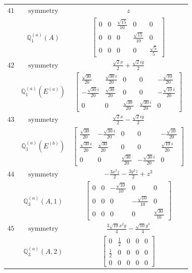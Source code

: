 \documentclass[fleqn,8pt,landscape]{jsarticle}
\begin{document}
\begin{longtable}{ccc}
$ 41 $ & $ \text{symmetry} $ & $ z $ \\
$  $ & $ \mathbb{Q}_{1}^{(a)}(A) $ & $ \begin{bmatrix} 0 & 0 & \frac{\sqrt{15}}{10} & 0 & 0 \\ 0 & 0 & 0 & \frac{\sqrt{15}}{10} & 0 \\ 0 & 0 & 0 & 0 & \frac{\sqrt{5}}{5} \end{bmatrix} $ \\ \hline
$ 42 $ & $ \text{symmetry} $ & $ \frac{\sqrt{2} x}{2} + \frac{\sqrt{2} i y}{2} $ \\
$  $ & $ \mathbb{Q}_{1}^{(a)}(E^{(a)}) $ & $ \begin{bmatrix} \frac{\sqrt{30}}{20} & \frac{\sqrt{30} i}{20} & 0 & 0 & - \frac{\sqrt{10}}{20} \\ - \frac{\sqrt{30} i}{20} & \frac{\sqrt{30}}{20} & 0 & 0 & - \frac{\sqrt{10} i}{20} \\ 0 & 0 & \frac{\sqrt{30}}{20} & \frac{\sqrt{30} i}{20} & 0 \end{bmatrix} $ \\ \hline
$ 43 $ & $ \text{symmetry} $ & $ \frac{\sqrt{2} x}{2} - \frac{\sqrt{2} i y}{2} $ \\
$  $ & $ \mathbb{Q}_{1}^{(a)}(E^{(b)}) $ & $ \begin{bmatrix} \frac{\sqrt{30}}{20} & - \frac{\sqrt{30} i}{20} & 0 & 0 & - \frac{\sqrt{10}}{20} \\ \frac{\sqrt{30} i}{20} & \frac{\sqrt{30}}{20} & 0 & 0 & \frac{\sqrt{10} i}{20} \\ 0 & 0 & \frac{\sqrt{30}}{20} & - \frac{\sqrt{30} i}{20} & 0 \end{bmatrix} $ \\ \hline
$ 44 $ & $ \text{symmetry} $ & $ - \frac{3 x^{2} z}{2} - \frac{3 y^{2} z}{2} + z^{3} $ \\
$  $ & $ \mathbb{Q}_{3}^{(a)}(A,1) $ & $ \begin{bmatrix} 0 & 0 & - \frac{\sqrt{10}}{10} & 0 & 0 \\ 0 & 0 & 0 & - \frac{\sqrt{10}}{10} & 0 \\ 0 & 0 & 0 & 0 & \frac{\sqrt{30}}{10} \end{bmatrix} $ \\ \hline
$ 45 $ & $ \text{symmetry} $ & $ \frac{3 \sqrt{10} x^{2} y}{4} - \frac{\sqrt{10} y^{3}}{4} $ \\
$  $ & $ \mathbb{Q}_{3}^{(a)}(A,2) $ & $ \begin{bmatrix} 0 & \frac{1}{2} & 0 & 0 & 0 \\ \frac{1}{2} & 0 & 0 & 0 & 0 \\ 0 & 0 & 0 & 0 & 0 \end{bmatrix} $ \\ \hline

\end{longtable}
\end{document}

